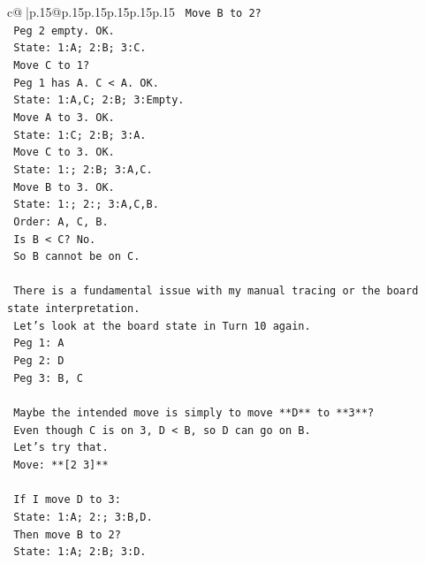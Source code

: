 \documentclass{article}
\begin{document}
{\begin{supertabular}{c@{$\;$}|p{.15\linewidth}@{}p{.15\linewidth}p{.15\linewidth}p{.15\linewidth}p{.15\linewidth}p{.15\linewidth}}
{{{\texttt{            Move B to 2?} \\
\texttt{            Peg 2 empty. OK.} \\
\texttt{            State: 1:A; 2:B; 3:C.} \\
\texttt{            Move C to 1?} \\
\texttt{            Peg 1 has A. C < A. OK.} \\
\texttt{            State: 1:A,C; 2:B; 3:Empty.} \\
\texttt{            Move A to 3. OK.} \\
\texttt{            State: 1:C; 2:B; 3:A.} \\
\texttt{            Move C to 3. OK.} \\
\texttt{            State: 1:; 2:B; 3:A,C.} \\
\texttt{            Move B to 3. OK.} \\
\texttt{            State: 1:; 2:; 3:A,C,B.} \\
\texttt{            Order: A, C, B.} \\
\texttt{            Is B < C? No.} \\
\texttt{            So B cannot be on C.} \\
\\ 
\texttt{            There is a fundamental issue with my manual tracing or the board state interpretation.} \\
\texttt{            Let's look at the board state in Turn 10 again.} \\
\texttt{            Peg 1: A} \\
\texttt{            Peg 2: D} \\
\texttt{            Peg 3: B, C} \\
\\ 
\texttt{            Maybe the intended move is simply to move **D** to **3**?} \\
\texttt{            Even though C is on 3, D < B, so D can go on B.} \\
\texttt{            Let's try that.} \\
\texttt{            Move: **{[}2 3{]}**} \\
\\ 
\texttt{            If I move D to 3:} \\
\texttt{            State: 1:A; 2:; 3:B,D.} \\
\texttt{            Then move B to 2?} \\
\texttt{            State: 1:A; 2:B; 3:D.} \\
}}}
\end{supertabular}}
\end{document}
